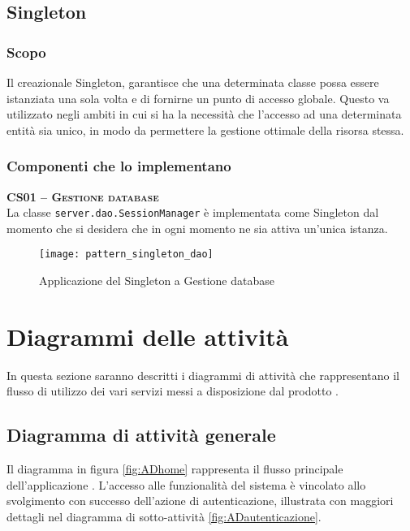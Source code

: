 \subsection{Singleton}

\subsubsection{Scopo}
Il  creazionale Singleton, garantisce che una determinata classe possa essere istanziata una sola volta e di fornirne un punto di accesso globale. Questo  va utilizzato negli ambiti in cui si ha la necessità che l'accesso ad una determinata entità sia unico, in modo da permettere la gestione ottimale della risorsa stessa.

\subsubsection{Componenti che lo implementano}
\begin{description}
  \item{\scshape\bfseries CS01 -- Gestione database}\\
La classe \texttt{server.dao.SessionManager} è implementata come Singleton dal momento che si desidera che in ogni momento ne sia attiva un'unica istanza. 

\begin{figure}[H]
  \centering
  \texttt{[image: pattern\_singleton\_dao]}
  \caption{Applicazione del  Singleton a \textsf{Gestione database}}\label{fig:singleton2}
\end{figure}

\end{description}
\clearpage

\section{Diagrammi delle attività}
In questa sezione saranno descritti i diagrammi di attività che rappresentano il flusso di utilizzo dei vari servizi messi a disposizione dal prodotto \caName.

\subsection{Diagramma di attività generale}

Il diagramma in figura \vref{fig:ADhome} rappresenta il flusso principale dell'applicazione \caName. L'accesso alle funzionalità del sistema è vincolato allo svolgimento con successo dell'azione di autenticazione, illustrata con maggiori dettagli nel diagramma di sotto-attività \vref{fig:ADautenticazione}.


